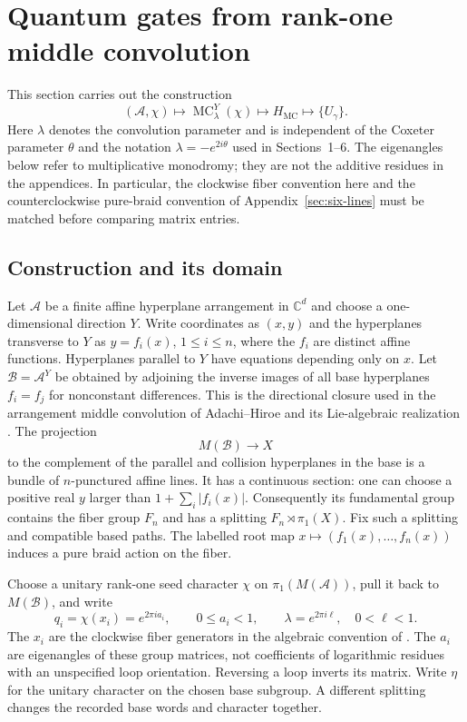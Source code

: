 \documentclass[11pt,a4paper]{article}
\theoremstyle{remark}\newtheorem{remark}[theorem]{Remark}
\newcommand{\C}{\mathbb C}
\newcommand{\A}{\mathcal A}
\newcommand{\B}{\mathcal B}
\newcommand{\MC}{\operatorname{MC}}
\begin{document}
\section{Quantum gates from rank-one middle convolution}
\label{sec:mc-gates}
This section carries out the construction
\[
 (\A,\chi)\longmapsto\MC^Y_\lambda(\chi)
 \longmapsto H_{\MC}\longmapsto\{U_\gamma\}.
\]
Here $\lambda$ denotes the convolution parameter and is independent of
the Coxeter parameter $\theta$ and the notation $\lambda=-e^{2i\theta}$
used in Sections~1--6. The eigenangles below refer to multiplicative
monodromy; they are not the additive residues in the appendices.
In particular, the clockwise fiber convention here and the
counterclockwise pure-braid convention of Appendix~\ref{sec:six-lines}
must be matched before comparing matrix entries.

\subsection{Construction and its domain}
Let $\A$ be a finite affine hyperplane arrangement in $\C^d$ and choose
a one-dimensional direction $Y$. Write coordinates as $(x,y)$ and the
hyperplanes transverse to $Y$ as $y=f_i(x)$, $1\le i\le n$, where the
$f_i$ are distinct affine functions. Hyperplanes parallel to $Y$ have
equations depending only on $x$.
Let $\B=\A^Y$ be obtained by adjoining the inverse images of all base
hyperplanes $f_i=f_j$ for nonconstant differences. This is the directional
closure used in the arrangement middle convolution of Adachi--Hiroe
\cite{AH} and its Lie-algebraic realization \cite{Hiroe}.
The projection
\[
 M(\B)\longrightarrow X
\]
to the complement of the parallel and collision hyperplanes in the base
is a bundle of $n$-punctured affine lines. It has a continuous section:
one can choose a positive real $y$ larger than $1+\sum_i|f_i(x)|$.
Consequently its fundamental group contains the fiber group $F_n$ and
has a splitting $F_n\rtimes\pi_1(X)$. Fix such a splitting and compatible
based paths. The labelled root map $x\mapsto(f_1(x),\ldots,f_n(x))$
induces a pure braid action on the fiber.

Choose a unitary rank-one seed character $\chi$ on $\pi_1(M(\A))$,
pull it back to $M(\B)$, and write
\[
 q_i=\chi(x_i)=e^{2\pi i a_i},\qquad 0\le a_i<1,
 \qquad \lambda=e^{2\pi i\ell},\quad 0<\ell<1.
\]
The $x_i$ are the clockwise fiber generators in the algebraic convention
of \cite{NegamiKZ}. The $a_i$ are eigenangles of these group matrices,
not coefficients of logarithmic residues with an unspecified loop
orientation. Reversing a loop inverts its matrix. Write $\eta$ for the
unitary character on the chosen base subgroup. A different splitting
changes the recorded base words and character together.
\end{document}
